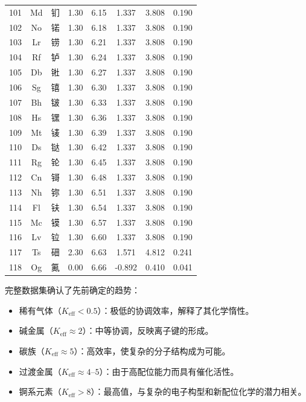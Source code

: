 \documentclass[11pt,a4paper]{article}
\newcommand{\Keff}{K_{\mathrm{eff}}}
\begin{document}
\begin{longtable}{|c|c|p{2.5cm}|c|c|c|c|c|}
		101& Md & 钔 & 1.30 & 6.15 & 1.337  & 3.808  & 0.190 \\
		102& No & 锘 & 1.30 & 6.18 & 1.337  & 3.808  & 0.190 \\
		103& Lr & 铹 & 1.30 & 6.21 & 1.337  & 3.808  & 0.190 \\
		104& Rf & 𬬻 & 1.30 & 6.24 & 1.337  & 3.808  & 0.190 \\
		105& Db & 𬭊 & 1.30 & 6.27 & 1.337  & 3.808  & 0.190 \\
		106& Sg & 𬭳 & 1.30 & 6.30 & 1.337  & 3.808  & 0.190 \\
		107& Bh & 𬭛 & 1.30 & 6.33 & 1.337  & 3.808  & 0.190 \\
		108& Hs & 𬭶 & 1.30 & 6.36 & 1.337  & 3.808  & 0.190 \\
		109& Mt & 鿏 & 1.30 & 6.39 & 1.337  & 3.808  & 0.190 \\
		110& Ds & 𫟼 & 1.30 & 6.42 & 1.337  & 3.808  & 0.190 \\
		111& Rg & 𬬭 & 1.30 & 6.45 & 1.337  & 3.808  & 0.190 \\
		112& Cn & 鿔 & 1.30 & 6.48 & 1.337  & 3.808  & 0.190 \\
		113& Nh & 鿭 & 1.30 & 6.51 & 1.337  & 3.808  & 0.190 \\
		114& Fl & 𫓧 & 1.30 & 6.54 & 1.337  & 3.808  & 0.190 \\
		115& Mc & 镆 & 1.30 & 6.57 & 1.337  & 3.808  & 0.190 \\
		116& Lv & 𫟷 & 1.30 & 6.60 & 1.337  & 3.808  & 0.190 \\
		117& Ts & 鿬 & 2.30 & 6.63 & 1.571  & 4.812  & 0.241 \\
		118& Og & 鿫 & 0.00 & 6.66 & -0.892 & 0.410  & 0.041 \\
		\hline
	\end{longtable}
	
	完整数据集确认了先前确定的趋势：
	\begin{itemize}
		\item 稀有气体（$\Keff < 0.5$）：极低的协调效率，解释了其化学惰性。
		\item 碱金属（$\Keff \approx 2$）：中等协调，反映离子键的形成。
		\item 碳族（$\Keff \approx 5$）：高效率，使复杂的分子结构成为可能。
		\item 过渡金属（$\Keff \approx 4$–$5$）：由于高配位能力而具有催化活性。
		\item 锕系元素（$\Keff > 8$）：最高值，与复杂的电子构型和新配位化学的潜力相关。
	\end{itemize}
	
\end{document}
